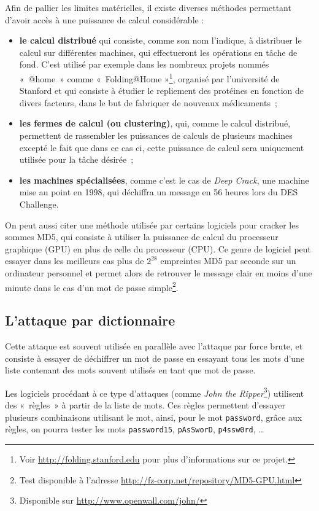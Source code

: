 Afin de pallier les limites matérielles, il existe diverses
méthodes permettant d'avoir accès à une puissance de
calcul considérable :
\begin{itemize}
  \item {\sffamily\textbf{le calcul distribué}} qui consiste, comme son nom
l'indique,
à distribuer le calcul sur différentes machines, qui effectueront
les opérations en tâche de fond. C'est utilisé par exemple dans
les nombreux projets nommés «~@home~» comme «~Folding@Home
»\footnote{Voir \url{http://folding.stanford.edu} pour plus
d'informations sur ce projet.},
organisé par l'université de Stanford et qui consiste à étudier
le repliement des protéines en fonction de divers facteurs, dans
le but de fabriquer de nouveaux médicaments~;
  \item {\sffamily\textbf{les fermes de calcul (ou clustering)}}, qui, comme le
calcul distribué, permettent de rassembler les puissances de
calculs de plusieurs machines excepté le fait que dans ce cas ci, cette
puissance de calcul sera uniquement utilisée pour la tâche
désirée~;
  \item {\sffamily\textbf{les machines spécialisées}}, comme c'est le cas de
\emph{Deep Crack}, une machine mise au point en 1998, qui déchiffra
un message en 56 heures lors du DES Challenge.\\
\end{itemize}

On peut aussi citer une méthode utilisée par certains logiciels pour
cracker les sommes MD5, qui consiste à utiliser la
puissance de calcul du processeur graphique (GPU) en plus de celle
du processeur (CPU). Ce genre de logiciel peut essayer dans les
meilleurs cas plus de
$2^{28}$ empreintes MD5 par seconde sur un ordinateur 
personnel et permet alors de retrouver le message clair en
moins d'une minute dans le cas d'un mot de passe simple\footnote{Test disponible à l'adresse
\url{http://fz-corp.net/repository/MD5-GPU.html}}.

\subsection{L'attaque par dictionnaire}
Cette attaque est souvent utilisée en parallèle avec l'attaque par
force brute, et consiste à essayer de déchiffrer un mot de passe
en essayant tous les mots d'une liste contenant des mots souvent
utilisés en tant que mot de passe.

Les logiciels procédant à ce type d'attaques (comme \emph{John the
Ripper}\footnote{Disponible sur
\url{http://www.openwall.com/john/}}) utilisent des «~règles~» à
partir de la liste de mots. Ces règles permettent d'essayer
plusieurs combinaisons utilisant le mot, ainsi, pour le mot
\texttt{password}, grâce aux règles, on pourra tester les mots
\texttt{password15}, \texttt{pAsSworD}, \texttt{p4ssw0rd}, \dots

